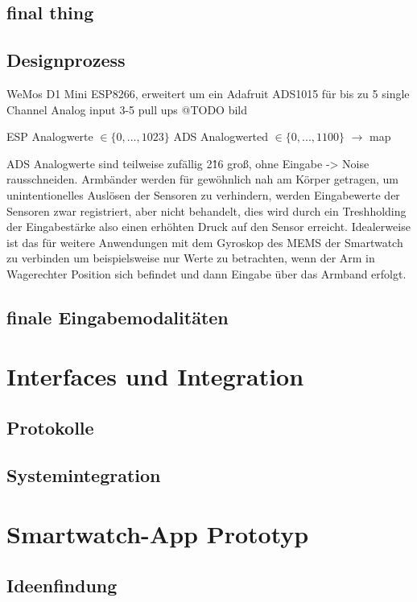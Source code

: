 \documentclass[12pt, a4paper]{article}
\begin{document}
\subsection{final thing}

\subsection{Designprozess}

WeMos D1 Mini ESP8266, erweitert um ein Adafruit ADS1015 für bis zu 5 single Channel Analog input 3-5 pull ups
@TODO bild

ESP Analogwerte $\in \{0,...,1023\}$
ADS Analogwerted $\in \{0,...,1100\}$ $\to $ map 

ADS Analogwerte sind teilweise zufällig 2\^16 groß, ohne Eingabe -> Noise rausschneiden. Armbänder werden für gewöhnlich nah am Körper getragen, um unintentionelles Auslösen der Sensoren zu verhindern, werden Eingabewerte der Sensoren zwar registriert, aber nicht behandelt, dies wird durch ein Treshholding der Eingabestärke also einen erhöhten Druck auf den Sensor erreicht. Idealerweise ist das für weitere Anwendungen mit dem Gyroskop des MEMS der Smartwatch zu verbinden um beispielsweise nur Werte zu betrachten, wenn der Arm in Wagerechter Position sich befindet und dann Eingabe über das Armband erfolgt. 


\subsection{finale Eingabemodalitäten}

\section{Interfaces und Integration}

\subsection{Protokolle}

\subsection{Systemintegration}

\section{Smartwatch-App Prototyp}

\subsection{Ideenfindung}
\end{document}
